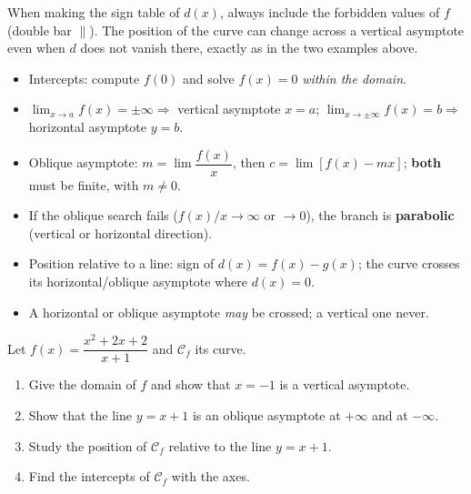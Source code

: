 \documentclass[11pt]{article}
\begin{document}
\begin{attention}
When making the sign table of $d(x)$, always include the forbidden values of $f$ (double bar $\|$). The position of the curve can change across a vertical asymptote even when $d$ does not vanish there, exactly as in the two examples above.
\end{attention}

\begin{aretenir}
\begin{itemize}
\item Intercepts: compute $f(0)$ and solve $f(x)=0$ \emph{within the domain}.
\item $\lim_{x\to a}f(x)=\pm\infty \Rightarrow$ vertical asymptote $x=a$; $\lim_{x\to\pm\infty}f(x)=b \Rightarrow$ horizontal asymptote $y=b$.
\item Oblique asymptote: $m=\lim \dfrac{f(x)}{x}$, then $c=\lim[f(x)-mx]$; \textbf{both} must be finite, with $m\neq 0$.
\item If the oblique search fails ($f(x)/x\to\infty$ or $\to 0$), the branch is \textbf{parabolic} (vertical or horizontal direction).
\item Position relative to a line: sign of $d(x)=f(x)-g(x)$; the curve crosses its horizontal/oblique asymptote where $d(x)=0$.
\item A horizontal or oblique asymptote \emph{may} be crossed; a vertical one never.
\end{itemize}
\end{aretenir}

\begin{exercice}
Let $f(x)=\dfrac{x^{2}+2x+2}{x+1}$ and $\mathcal{C}_f$ its curve.
\begin{enumerate}
\item Give the domain of $f$ and show that $x=-1$ is a vertical asymptote.
\item Show that the line $y=x+1$ is an oblique asymptote at $+\infty$ and at $-\infty$.
\item Study the position of $\mathcal{C}_f$ relative to the line $y=x+1$.
\item Find the intercepts of $\mathcal{C}_f$ with the axes.
\end{enumerate}
\end{exercice}
\end{document}
